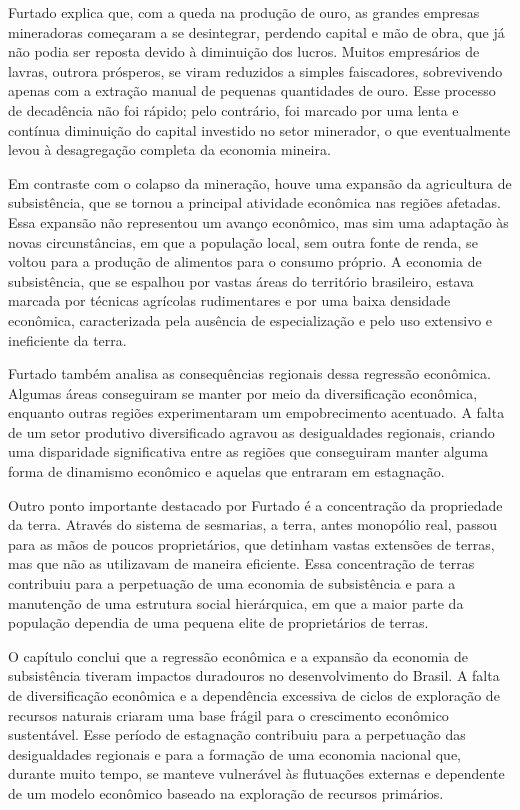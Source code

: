 \documentclass[a4paper,12pt]{article}[abntex2]
\begin{document}
Furtado explica que, com a queda na produção de ouro, as grandes empresas mineradoras começaram a se desintegrar, perdendo capital e mão de obra, que já não podia ser reposta devido à diminuição dos lucros. Muitos empresários de lavras, outrora prósperos, se viram reduzidos a simples faiscadores, sobrevivendo apenas com a extração manual de pequenas quantidades de ouro. Esse processo de decadência não foi rápido; pelo contrário, foi marcado por uma lenta e contínua diminuição do capital investido no setor minerador, o que eventualmente levou à desagregação completa da economia mineira.

Em contraste com o colapso da mineração, houve uma expansão da agricultura de subsistência, que se tornou a principal atividade econômica nas regiões afetadas. Essa expansão não representou um avanço econômico, mas sim uma adaptação às novas circunstâncias, em que a população local, sem outra fonte de renda, se voltou para a produção de alimentos para o consumo próprio. A economia de subsistência, que se espalhou por vastas áreas do território brasileiro, estava marcada por técnicas agrícolas rudimentares e por uma baixa densidade econômica, caracterizada pela ausência de especialização e pelo uso extensivo e ineficiente da terra.

Furtado também analisa as consequências regionais dessa regressão econômica. Algumas áreas conseguiram se manter por meio da diversificação econômica, enquanto outras regiões experimentaram um empobrecimento acentuado. A falta de um setor produtivo diversificado agravou as desigualdades regionais, criando uma disparidade significativa entre as regiões que conseguiram manter alguma forma de dinamismo econômico e aquelas que entraram em estagnação.

Outro ponto importante destacado por Furtado é a concentração da propriedade da terra. Através do sistema de sesmarias, a terra, antes monopólio real, passou para as mãos de poucos proprietários, que detinham vastas extensões de terras, mas que não as utilizavam de maneira eficiente. Essa concentração de terras contribuiu para a perpetuação de uma economia de subsistência e para a manutenção de uma estrutura social hierárquica, em que a maior parte da população dependia de uma pequena elite de proprietários de terras.

O capítulo conclui que a regressão econômica e a expansão da economia de subsistência tiveram impactos duradouros no desenvolvimento do Brasil. A falta de diversificação econômica e a dependência excessiva de ciclos de exploração de recursos naturais criaram uma base frágil para o crescimento econômico sustentável. Esse período de estagnação contribuiu para a perpetuação das desigualdades regionais e para a formação de uma economia nacional que, durante muito tempo, se manteve vulnerável às flutuações externas e dependente de um modelo econômico baseado na exploração de recursos primários.
\end{document}
